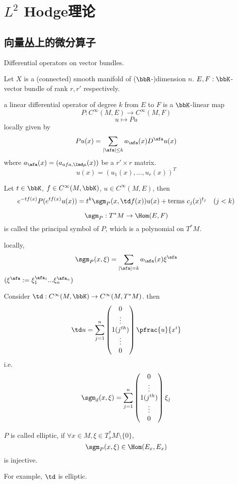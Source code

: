 \chapter{$L^2$ Hodge理论}

\section{向量丛上的微分算子}
Differential operators on vector bundles.

Let $X$ is a (connected) smooth manifold of ($\bbR$-)dimension $n$.
$E,F:\bbK$-vector bundle of rank $r,r'$ respectively.

\begin{definition}
a linear differential operator of degree $k$ from $E$ to $F$ is a $\bbK$-linear map
$$P:C^\infty(M,E)\to C^\infty(M,F)$$
$$u\mapsto Pu$$
locally given by
$$Pu(x)=\sum_{|\afa|\leq k}a_{\afa}(x)D^\afa u(x)$$
where $a_\afa(x)=(a_{afa,\lmd\mu}(x))$ be a $r'\times r$ matrix.
$$
u(x)=(u_1(x),...,u_r(x))^T
$$
\end{definition}

Let $t\in\bbK$, $f\in C^\infty(M,\bbK)$, $u\in C^\infty(M,E)$,
then
$$e^{-tf(x)}P(e^{tf(x)}u(x))=
t^k\sgm_P(x,\td f(x))u(x)+\text{terms } c_j(x)^{t_j}\quad(j<k)$$
\begin{definition}
$$\sgm_P:T^*M\to\Hom(E,F)$$
is called the principal symbol of $P$, which is a polynomial on $T^*M$.
\end{definition}
locally,
$$\sgm_P(x,\xi)=\sum_{|\afa|=k}a_\afa(x)\xi^\afa$$
$(\xi^\afa:=\xi_1^{\afa_1}...\xi_n^{\afa_n})$

\begin{example}
Consider $\td: C^\infty(M,\bbK)\to C^{\infty}(M,T^*M)$.
then
$$\td u=
\sum_{j=1}^n
\begin{pmatrix}
0\\
\vdots\\
1(j^{th})\\
\vdots\\
0
\end{pmatrix}
\pfrac{u}{x^i}$$
i.e.
$$\sgm_d(x,\xi)
=\sum_{j=1}^n
\begin{pmatrix}
0\\
\vdots\\
1(j^{th})\\
\vdots\\
0
\end{pmatrix}\xi_j$$
\end{example}
\begin{definition}
$P$ is called elliptic, if $\forall x\in M,\xi\in T^*_xM\setminus\{0\}$,
$$\sgm_P(x,\xi)\in \Hom(E_x,E_x)$$
is injective.
\end{definition}
For example, $\td$ is elliptic.

